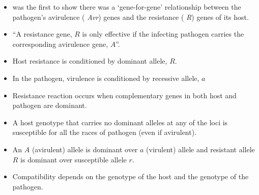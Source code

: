 \documentclass[11pt,dvipsnames,ignorenonframetext,aspectratio=169]{beamer}
\providecommand{\tightlist}{%
  \setlength{\itemsep}{0pt}\setlength{\parskip}{0pt}}
\begin{document}
\begin{frame}{}
\protect\hypertarget{section-10}{}
\begin{itemize}
\tightlist
\item
  \citet{flor1956complementary} was the first to show there was a
  `gene-for-gene' relationship between the pathogen's avirulence (
  \emph{Avr}) genes and the resistance ( \emph{R}) genes of its host.
\item
  ``A resistance gene, \(R\) is only effective if the infecting pathogen
  carries the corresponding avirulence gene, \(A\)''.
\item
  Host resistance is conditioned by dominant allele, \(R\).
\item
  In the pathogen, virulence is conditioned by recessive allele, \(a\)
\item
  Resistance reaction occurs when complementary genes in both host and
  pathogen are dominant.
\item
  A host genotype that carries no dominant alleles at any of the loci is
  susceptible for all the races of pathogen (even if avirulent).
\item
  An \(A\) (avirulent) allele is dominant over \(a\) (virulent) allele
  and resistant allele \(R\) is dominant over susceptible allele \(r\).
\item
  Compatibility depends on the genotype of the host and the genotype of
  the pathogen.
\end{itemize}
\end{frame}
\end{document}
